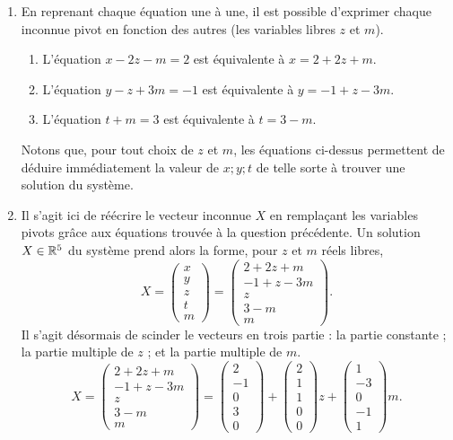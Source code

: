 {\begin{enumerate}
		Nommons $(x ; y ; z ; t ; m)$ le vecteur inconnue de $\R^5$.
		Les colonnes à pivots sont alors associées aux inconnues $x ; y ; t$.
		\item
		En reprenant chaque équation une à une, il est possible d'exprimer chaque inconnue pivot en fonction des autres (les variables libres $z$ et $m$).
		\begin{enumerate}[label=Équation \arabic* :]
			\item
			L'équation $x-2z-m=2$ est équivalente à $x=2+2z+m$.
			\item
			L'équation $y-z+3m = -1$ est équivalente à $y = -1+z-3m$.
			\item
			L'équation $t+m = 3$ est équivalente à $t=3-m$.
		\end{enumerate}
		Notons que, pour tout choix de $z$ et $m$, les équations ci-dessus permettent de déduire immédiatement la valeur de $x ; y ; t$ de telle sorte à trouver une solution du système.
		\item
		Il s'agit ici de réécrire le vecteur inconnue $X$ en remplaçant les variables pivots grâce aux équations trouvée à la question précédente.
		Un solution $X\in\mathbb{R}^5$ du système prend alors la forme, pour $z$ et $m$ réels libres,
			\[ X = \begin{pmatrix}x\\y\\z\\t\\m\end{pmatrix} = \begin{pmatrix}2+2z+m\\-1+z-3m\\z\\3-m\\m\end{pmatrix}. \]
		Il s'agit désormais de scinder le vecteurs en trois partie : la partie constante ; la partie multiple de $z$ ; et la partie multiple de $m$.
			\[ X =\begin{pmatrix}2+2z+m\\-1+z-3m\\z\\3-m\\m\end{pmatrix} = \begin{pmatrix}2\\-1\\0\\3\\0\end{pmatrix} + \begin{pmatrix}2\\1\\1\\0\\0\end{pmatrix}z + \begin{pmatrix}1\\-3\\0\\-1\\1\end{pmatrix}m. \]

\end{enumerate}}

